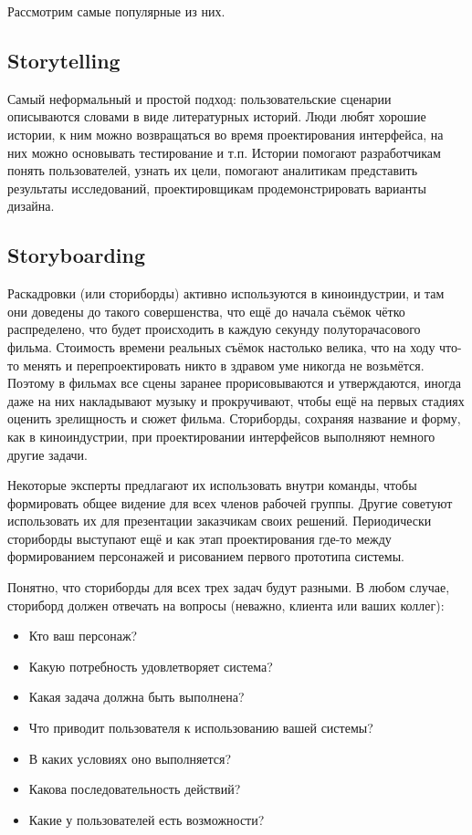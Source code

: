 \documentclass{../../text-style}
\begin{document}
Рассмотрим самые популярные из них.

\subsection{Storytelling}

Самый неформальный и простой подход: пользовательские сценарии описываются словами в виде литературных историй. Люди любят хорошие истории, к ним можно возвращаться во время проектирования интерфейса, на них можно основывать тестирование и т.п. Истории помогают разработчикам понять пользователей, узнать их цели, помогают аналитикам представить результаты исследований, проектировщикам продемонстрировать варианты дизайна.

\subsection{Storyboarding}

Раскадровки (или сториборды) активно используются в киноиндустрии, и там они доведены до такого совершенства, что ещё до начала съёмок чётко распределено, что будет происходить в каждую секунду полуторачасового фильма. Стоимость времени реальных съёмок настолько велика, что на ходу что-то менять и перепроектировать никто в здравом уме никогда не возьмётся. Поэтому в фильмах все сцены заранее прорисовываются и утверждаются, иногда даже на них накладывают музыку и прокручивают, чтобы ещё на первых стадиях оценить зрелищность и сюжет фильма. Сториборды, сохраняя название и форму, как в киноиндустрии, при проектировании интерфейсов выполняют немного другие задачи.

Некоторые эксперты предлагают их использовать внутри команды, чтобы формировать общее видение для всех членов рабочей группы. Другие советуют использовать их для презентации заказчикам своих решений. Периодически сториборды выступают ещё и как этап проектирования где-то между формированием персонажей и рисованием первого прототипа системы.

Понятно, что сториборды для всех трех задач будут разными. В любом случае, сториборд должен отвечать на вопросы (неважно, клиента или ваших коллег):

\begin{itemize}
    \item Кто ваш персонаж?
    \item Какую потребность удовлетворяет система?
    \item Какая задача должна быть выполнена?
    \item Что приводит пользователя к использованию вашей системы?
    \item В каких условиях оно выполняется?
    \item Какова последовательность действий?
    \item Какие у пользователей есть возможности?
\end{itemize}
\end{document}
